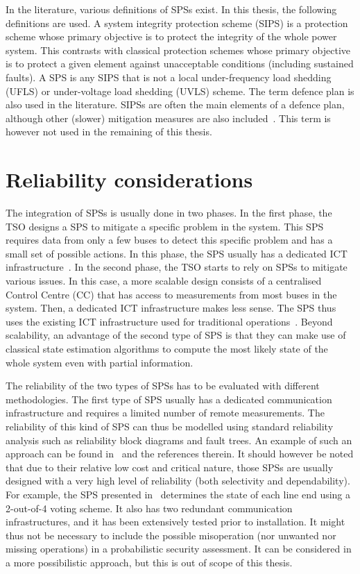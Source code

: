 In the literature, various definitions of SPSs exist. In this thesis, the following definitions are used. A system integrity protection scheme (SIPS) is a protection scheme whose primary objective is to protect the integrity of the whole power system. This contrasts with classical protection schemes whose primary objective is to protect a given element against unacceptable conditions (including sustained faults). A SPS is any SIPS that is not a local under-frequency load shedding (UFLS) or under-voltage load shedding (UVLS) scheme. The term defence plan is also used in the literature. SIPSs are often the main elements of a defence plan, although other (slower) mitigation measures are also included~\cite{CigreDefensePlan, ENTSOEdefencePlan}. This term is however not used in the remaining of this thesis.

\section{Reliability considerations}
\label{sec:SPSreliability}

The integration of SPSs is usually done in two phases. In the first phase, the TSO designs a SPS to mitigate a specific problem in the system. This SPS requires data from only a few buses to detect this specific problem and has a small set of possible actions. In this phase, the SPS usually has a dedicated ICT infrastructure~\cite{BelgiumSPS}. In the second phase, the TSO starts to rely on SPSs to mitigate various issues. In this case, a more scalable design consists of a centralised Control Centre (CC) that has access to measurements from most buses in the system. Then, a dedicated ICT infrastructure makes less sense. The SPS thus uses the existing ICT infrastructure used for traditional operations~\cite{GeorgiaSPS, UruguaySPS}. Beyond scalability, an advantage of the second type of SPS is that they can make use of classical state estimation algorithms to compute the most likely state of the whole system even with partial information.

The reliability of the two types of SPSs has to be evaluated with different methodologies. The first type of SPS usually has a dedicated communication infrastructure and requires a limited number of remote measurements. The reliability of this kind of SPS can thus be modelled using standard reliability analysis such as reliability block diagrams and fault trees. An example of such an approach can be found in~\cite{SPSreliabilityThesis} and the references therein. It should however be noted that due to their relative low cost and critical nature, those SPSs are usually designed with a very high level of reliability (both selectivity and dependability). For example, the SPS presented in~\cite{BelgiumSPS} determines the state of each line end using a 2-out-of-4 voting scheme. It also has two redundant communication infrastructures, and it has been extensively tested prior to installation. It might thus not be necessary to include the possible misoperation (nor unwanted nor missing operations) in a probabilistic security assessment. It can be considered in a more possibilistic approach, but this is out of scope of this thesis.

